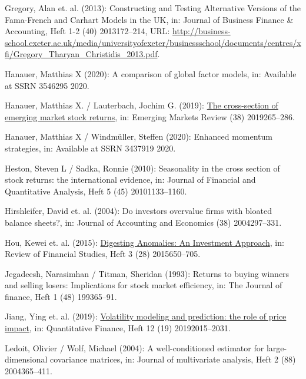 \documentclass[a4paper,12pt]{article}
\begin{document}
\begin{CSLReferences}{1}{0}
\leavevmode{}%
Gregory, Alan et. al. (2013): Constructing and Testing Alternative Versions of the Fama-French and Carhart Models in the UK, in: Journal of Business Finance \& Accounting, Heft 1-2 (40) 2013172--214, URL: \url{http://business-school.exeter.ac.uk/media/universityofexeter/businessschool/documents/centres/xfi/Gregory_Tharyan_Christidis_2013.pdf}.

\leavevmode{}%
Hanauer, Matthias X (2020): A comparison of global factor models, in: Available at SSRN 3546295 2020.

\leavevmode{}%
Hanauer, Matthias X. / Lauterbach, Jochim G. (2019): \href{https://doi.org/10.1016/j.ememar.2018.11.009}{The cross-section of emerging market stock returns}, in: Emerging Markets Review (38) 2019265--286.

\leavevmode{}%
Hanauer, Matthias X / Windmüller, Steffen (2020): Enhanced momentum strategies, in: Available at SSRN 3437919 2020.

\leavevmode{}%
Heston, Steven L / Sadka, Ronnie (2010): Seasonality in the cross section of stock returns: the international evidence, in: Journal of Financial and Quantitative Analysis, Heft 5 (45) 20101133--1160.

\leavevmode{}%
Hirshleifer, David et. al. (2004): Do investors overvalue firms with bloated balance sheets?, in: Journal of Accounting and Economics (38) 2004297--331.

\leavevmode{}%
Hou, Kewei et. al. (2015): \href{https://doi.org/10.1093/rfs/hhu068}{Digesting Anomalies: An Investment Approach}, in: Review of Financial Studies, Heft 3 (28) 2015650--705.

\leavevmode{}%
Jegadeesh, Narasimhan / Titman, Sheridan (1993): Returns to buying winners and selling losers: Implications for stock market efficiency, in: The Journal of finance, Heft 1 (48) 199365--91.

\leavevmode{}%
Jiang, Ying et. al. (2019): \href{https://doi.org/10.1080/14697688.2019.1636123}{Volatility modeling and prediction: the role of price impact}, in: Quantitative Finance, Heft 12 (19) 20192015--2031.

\leavevmode{}%
Ledoit, Olivier / Wolf, Michael (2004): A well-conditioned estimator for large-dimensional covariance matrices, in: Journal of multivariate analysis, Heft 2 (88) 2004365--411.


\end{CSLReferences}
\end{document}
